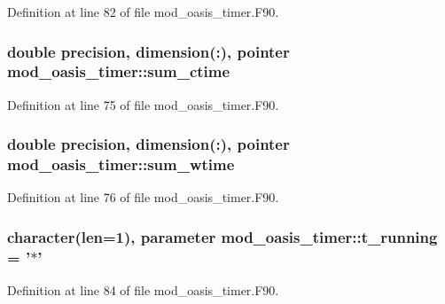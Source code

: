 Definition at line 82 of file mod\+\_\+oasis\+\_\+timer.\+F90.

\hypertarget{classmod__oasis__timer_a88e3c8171551da0ee64d10270484f6bf}{
\subsubsection[{sum\+\_\+ctime}]{\setlength{\rightskip}{0pt plus 5cm}double precision, dimension(\+:), pointer mod\+\_\+oasis\+\_\+timer\+::sum\+\_\+ctime\hspace{0.3cm}{\ttfamily [private]}}}\label{classmod__oasis__timer_a88e3c8171551da0ee64d10270484f6bf}


Definition at line 75 of file mod\+\_\+oasis\+\_\+timer.\+F90.

\hypertarget{classmod__oasis__timer_ab4d27b8be5c21939ab8d8e32d5582e9e}{
\subsubsection[{sum\+\_\+wtime}]{\setlength{\rightskip}{0pt plus 5cm}double precision, dimension(\+:), pointer mod\+\_\+oasis\+\_\+timer\+::sum\+\_\+wtime\hspace{0.3cm}{\ttfamily [private]}}}\label{classmod__oasis__timer_ab4d27b8be5c21939ab8d8e32d5582e9e}


Definition at line 76 of file mod\+\_\+oasis\+\_\+timer.\+F90.

\hypertarget{classmod__oasis__timer_a110185cdca99e2889419692182b0440a}{
\subsubsection[{t\+\_\+running}]{\setlength{\rightskip}{0pt plus 5cm}character(len=1), parameter mod\+\_\+oasis\+\_\+timer\+::t\+\_\+running = '$\ast$'\hspace{0.3cm}{\ttfamily [private]}}}\label{classmod__oasis__timer_a110185cdca99e2889419692182b0440a}


Definition at line 84 of file mod\+\_\+oasis\+\_\+timer.\+F90.

